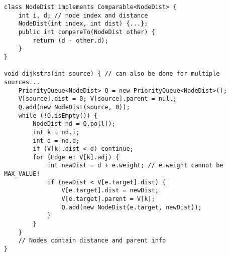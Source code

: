 \documentclass[9pt,a4paper,landscape,oneside]{amsart}
\begin{document}
\begin{multicols*}{3}
\begin{verbatim}
class NodeDist implements Comparable<NodeDist> {
    int i, d; // node index and distance
    NodeDist(int index, int dist) {...};
    public int compareTo(NodeDist other) {
        return (d - other.d);
    }
}

void dijkstra(int source) { // can also be done for multiple sources...
    PriorityQueue<NodeDist> Q = new PriorityQueue<NodeDist>();
    V[source].dist = 0; V[source].parent = null;
    Q.add(new NodeDist(source, 0));
    while (!Q.isEmpty()) {
        NodeDist nd = Q.poll();
        int k = nd.i;
        int d = nd.d;
        if (V[k].dist < d) continue;
        for (Edge e: V[k].adj) {
            int newDist = d + e.weight; // e.weight cannot be MAX_VALUE!
            if (newDist < V[e.target].dist) {
                V[e.target].dist = newDist;
                V[e.target].parent = V[k];
                Q.add(new NodeDist(e.target, newDist));
            }
        }
    }
    // Nodes contain distance and parent info
}
\end{verbatim}

\end{multicols*}
\end{document}
